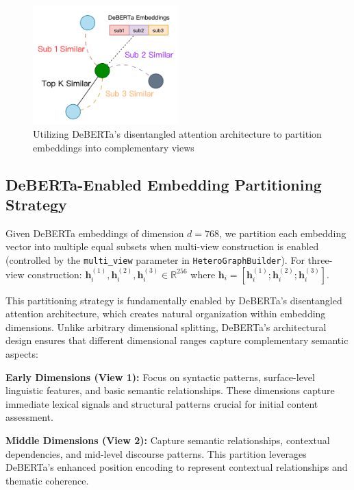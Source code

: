 \begin{figure}[h]
    \centering
    \includegraphics[width=0.5\textwidth]{context/methodology/fig/multi_view.png}
    \caption{Utilizing DeBERTa's disentangled attention architecture to partition embeddings into complementary views}
    \label{fig:multi_view}
\end{figure}

\subsection{DeBERTa-Enabled Embedding Partitioning Strategy}

Given DeBERTa embeddings of dimension $d = 768$, we partition each embedding vector into multiple equal subsets when multi-view construction is enabled (controlled by the \texttt{multi\_view} parameter in \texttt{HeteroGraphBuilder}). For three-view construction: $\mathbf{h}_i^{(1)}, \mathbf{h}_i^{(2)}, \mathbf{h}_i^{(3)} \in \mathbb{R}^{256}$ where $\mathbf{h}_i = [\mathbf{h}_i^{(1)}; \mathbf{h}_i^{(2)}; \mathbf{h}_i^{(3)}]$.

This partitioning strategy is fundamentally enabled by DeBERTa's disentangled attention architecture, which creates natural organization within embedding dimensions. Unlike arbitrary dimensional splitting, DeBERTa's architectural design ensures that different dimensional ranges capture complementary semantic aspects:

\textbf{Early Dimensions (View 1):} Focus on syntactic patterns, surface-level linguistic features, and basic semantic relationships. These dimensions capture immediate lexical signals and structural patterns crucial for initial content assessment.

\textbf{Middle Dimensions (View 2):} Capture semantic relationships, contextual dependencies, and mid-level discourse patterns. This partition leverages DeBERTa's enhanced position encoding to represent contextual relationships and thematic coherence.

